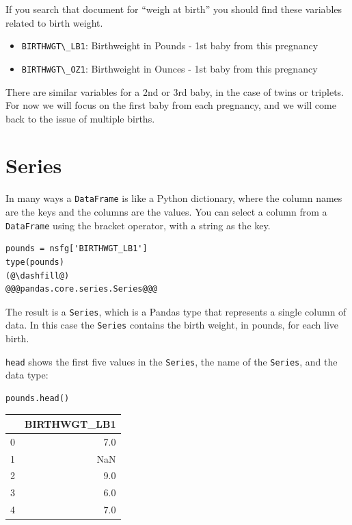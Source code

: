 If you search that document for ``weigh at birth'' you should find these
variables related to birth weight.

\begin{itemize}
\item
  \passthrough{\lstinline!BIRTHWGT\_LB1!}: Birthweight in Pounds - 1st
  baby from this pregnancy
\item
  \passthrough{\lstinline!BIRTHWGT\_OZ1!}: Birthweight in Ounces - 1st
  baby from this pregnancy
\end{itemize}

There are similar variables for a 2nd or 3rd baby, in the case of twins
or triplets. For now we will focus on the first baby from each
pregnancy, and we will come back to the issue of multiple births.

\hypertarget{series}{%
\section{Series}\label{series}}

In many ways a \passthrough{\lstinline!DataFrame!} is like a Python
dictionary, where the column names are the keys and the columns are the
values. You can select a column from a
\passthrough{\lstinline!DataFrame!} using the bracket operator, with a
string as the key.

\begin{lstlisting}[]
pounds = nsfg['BIRTHWGT_LB1']
type(pounds)
(@\dashfill@)
@@@pandas.core.series.Series@@@
\end{lstlisting}

The result is a \passthrough{\lstinline!Series!}, which is a Pandas type
that represents a single column of data. In this case the
\passthrough{\lstinline!Series!} contains the birth weight, in pounds,
for each live birth.

\passthrough{\lstinline!head!} shows the first five values in the
\passthrough{\lstinline!Series!}, the name of the
\passthrough{\lstinline!Series!}, and the data type:

\begin{lstlisting}[]
pounds.head()
\end{lstlisting}

\begin{tabular}{lr}
\midrule
{} &  BIRTHWGT\_LB1 \\
\midrule
0 &           7.0 \\
1 &           NaN \\
2 &           9.0 \\
3 &           6.0 \\
4 &           7.0 \\
\midrule
\end{tabular}

